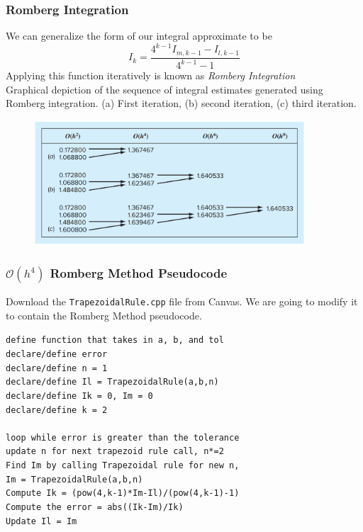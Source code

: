 \documentclass{if-beamer}
\begin{document}
\begin{frame}
	\frametitle{Romberg Integration}
	We can generalize the form of our integral approximate to be\\	
	$$ I_k = \frac{4^{k-1}I_{m, k-1}-I_{l,k-1}}{4^{k-1}-1}$$
	Applying this function iteratively is known as \textit{Romberg Integration}\\\vspace{10pt}
	Graphical depiction of the sequence of integral estimates generated using Romberg integration. (a) First iteration, (b) second iteration, (c) third iteration.
	\begin{figure}
		\centering
		\includegraphics[width = 0.9\textwidth]{figures/RI}
	\end{figure}
\end{frame}

\begin{frame}
	\frametitle{$\mathcal{O}(h^4)$ Romberg Method Pseudocode}
	Download the \texttt{TrapezoidalRule.cpp} file from Canvas. We are going to modify it to contain the Romberg Method pseudocode.\\\vspace{10pt}
	
	\texttt{define function that takes in a, b, and tol}\\
	\texttt{declare/define error}\\
	\texttt{declare/define n = 1}\\
	\texttt{declare/define Il = TrapezoidalRule(a,b,n)}\\
	\texttt{declare/define Ik = 0, Im = 0}\\
	\texttt{declare/define k = 2}\\
	\texttt{ }\\
	\texttt{loop while error is greater than the tolerance}\\
	\texttt{\qquad update n for next trapezoid rule call, n*=2 }\\
	\texttt{\qquad Find Im by calling Trapezoidal rule for new n,}\\
	\texttt{\qquad Im = TrapezoidalRule(a,b,n)}\\
	\texttt{\qquad Compute Ik = (pow(4,k-1)*Im-Il)/(pow(4,k-1)-1)}\\
	\texttt{\qquad Compute the error = abs((Ik-Im)/Ik)}\\
	\texttt{\qquad Update Il = Im}\\
	
\end{frame}
	
\end{document}
